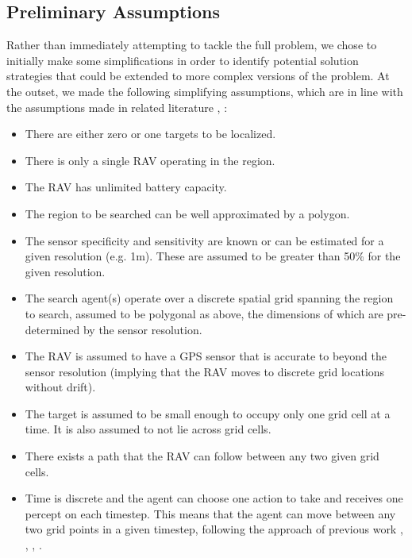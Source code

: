 \subsection{Preliminary Assumptions}\label{subsec:initalAssumptions}

Rather than immediately attempting to tackle the full problem, we chose to initially make some simplifications in order to identify potential solution strategies that could be extended to more complex versions of the problem. At the outset, we made the following simplifying assumptions, which are in line with the assumptions made in related literature \cite{Chung2007ASearch}, \cite{Chung2008Multi-agentFramework}:
\begin{itemize}
    \item There are either zero or one targets to be localized.
    \item There is only a single RAV operating in the region.
    \item The RAV has unlimited battery capacity.
    \item The region to be searched can be well approximated by a polygon.
    \item The sensor specificity and sensitivity are known or can be estimated for a given resolution (e.g. 1m). These are assumed to be greater than 50\% for the given resolution.
    \item The search agent(s) operate over a discrete spatial grid spanning the region to search, assumed to be polygonal as above, the dimensions of which are pre-determined by the sensor resolution.
    \item The RAV is assumed to have a GPS sensor that is accurate to beyond the sensor resolution (implying that the RAV moves to discrete grid locations without drift).
    \item The target is assumed to be small enough to occupy only one grid cell at a time. It is also assumed to not lie across grid cells.
    \item There exists a path that the RAV can follow between any two given grid cells.
    \item Time is discrete and the agent can choose one action to take and receives one percept on each timestep. This means that the agent can move between any two grid points in a given timestep, following the approach of previous work \cite{Chung2007ASearch}, \cite{Chung2008Multi-agentFramework}, \cite{Kriheli2016OptimalInspections}, \cite{Waharte2009CoordinatedUAVs}.
\end{itemize}
